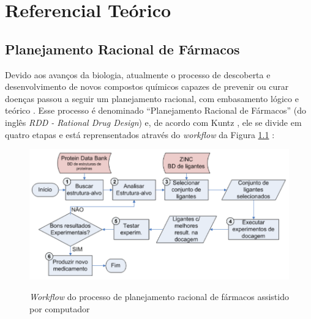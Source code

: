 \chapter{Referencial Teórico}

\section{Planejamento Racional de Fármacos}
Devido aos avanços da biologia, atualmente o processo de descoberta e desenvolvimento de novos compostos químicos capazes de prevenir ou curar doenças passou a seguir um planejamento racional, com embasamento lógico e teórico \cite{rdd}. Esse processo é denominado “Planejamento Racional de Fármacos” (do inglês \emph{RDD - Rational Drug Design}) e, de acordo com Kuntz \cite{kun92}, ele se divide em quatro etapas e está reprensentados através do \emph{workflow} da Figura \ref{fig:rddworkflow} \cite{kar11}: 

\begin{figure}[h]
	\center
	\includegraphics[width=14cm]{images/rdd_workflow.png}
	\label{fig:rddworkflow}
	\caption{\emph{Workflow} do processo de planejamento racional de fármacos assistido por computador \cite{kar11}}
\end{figure}


